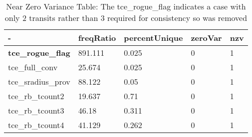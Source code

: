 \begin{table}[!htbp]
 \centering
 \caption{Near Zero Variance Table: The tce\_rogue\_flag indicates a case with only 2 transits rather than 3 required for consistency so was removed}
 \label{tbl:data/nzv.csv} 
  \begin{tabular}
{| 
 p{}| 
 p{}| 
 p{}| 
 p{}| 
 p{}| 
}\hline 
-&\textbf{freqRatio} &\textbf{percentUnique} &\textbf{zeroVar} &\textbf{nzv} \\ \hline 
\textbf{tce\_rogue\_flag} &891.111 &0.025 &0 &1 \\ \hline 
tce\_full\_conv &25.674 &0.025 &0 &1 \\ \hline 
tce\_sradius\_prov &88.122 &0.05 &0 &1 \\ \hline 
tce\_rb\_tcount2 &19.637 &0.71 &0 &1 \\ \hline 
tce\_rb\_tcount3 &46.18 &0.311 &0 &1 \\ \hline 
tce\_rb\_tcount4 &41.129 &0.262 &0 &1 \\ \hline 
\end{tabular} 
\end{table}